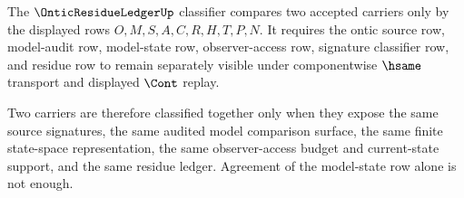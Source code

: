 \begin{definition}
\label{def:ontic-residue-ledger-classifier}
The $\OnticResidueLedgerUp$ classifier compares two accepted carriers only by the displayed rows $O,M,S,A,C,R,H,T,P,N$. It requires the ontic source row, model-audit row, model-state row, observer-access row, signature classifier row, and residue row to remain separately visible under componentwise $\hsame$ transport and displayed $\Cont$ replay.

Two carriers are therefore classified together only when they expose the same source signatures, the same audited model comparison surface, the same finite state-space representation, the same observer-access budget and current-state support, and the same residue ledger. Agreement of the model-state row alone is not enough.
\end{definition}


